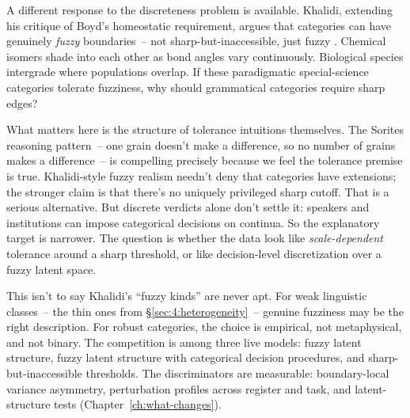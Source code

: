 A different response to the discreteness problem is available. Khalidi, extending his critique of Boyd's homeostatic requirement, argues that categories can have genuinely \emph{fuzzy} boundaries~-- not sharp-but-inaccessible, just fuzzy \citep[63--69]{khalidi2013}. Chemical isomers shade into each other as bond angles vary continuously. Biological species intergrade where populations overlap. If these paradigmatic special-science categories tolerate fuzziness, why should grammatical categories require sharp edges?

What matters here is the structure of tolerance intuitions themselves. The Sorites reasoning pattern~-- one grain doesn't make a difference, so no number of grains makes a difference~-- is compelling precisely because we feel the tolerance premise is true. Khalidi-style fuzzy realism needn't deny that categories have extensions; the stronger claim is that there's no uniquely privileged sharp cutoff. That is a serious alternative. But discrete verdicts alone don't settle it: speakers and institutions can impose categorical decisions on continua. So the explanatory target is narrower. The question is whether the data look like \emph{scale-dependent} tolerance around a sharp threshold, or like decision-level discretization over a fuzzy latent space.

This isn't to say Khalidi's \enquote{fuzzy kinds} are never apt. For weak linguistic classes~-- the thin ones from §\ref{sec:4:heterogeneity}~-- genuine fuzziness may be the right description. For robust categories, the choice is empirical, not metaphysical, and not binary. The competition is among three live models: fuzzy latent structure, fuzzy latent structure with categorical decision procedures, and sharp-but-inaccessible thresholds. The discriminators are measurable: boundary-local variance asymmetry, perturbation profiles across register and task, and latent-structure tests (Chapter~\ref{ch:what-changes}).

